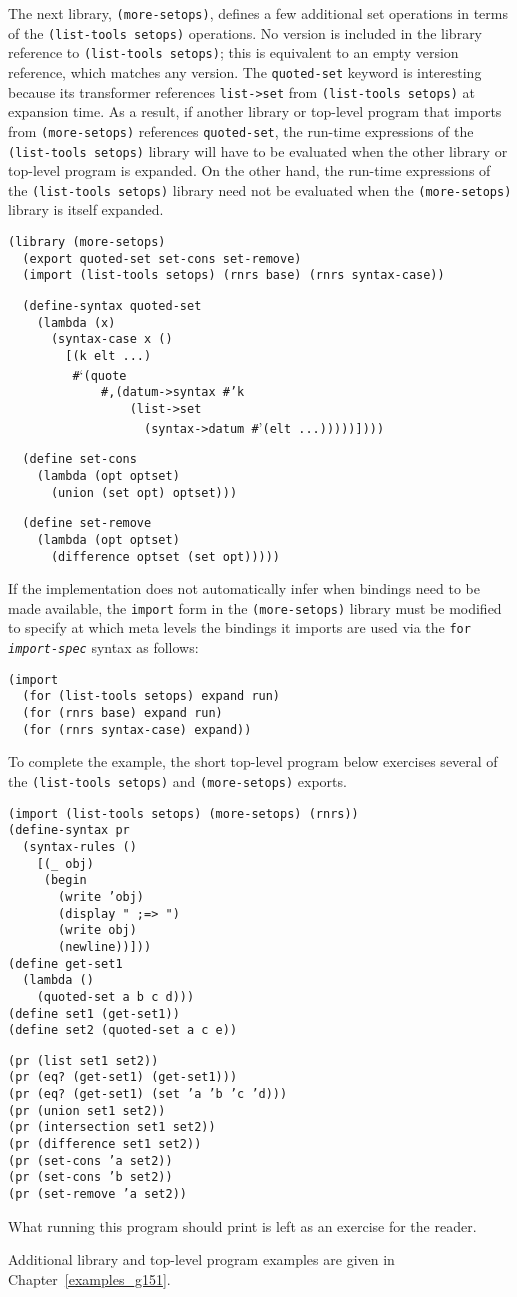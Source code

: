 The next library, \texttt{(more-setops)}, defines a few additional
set operations in terms of the \texttt{(list-tools setops)} operations.
No version is included in the library reference to
\texttt{(list-tools setops)}; this is equivalent to an empty version
reference, which matches any version.
The \texttt{quoted-set} keyword is interesting because its transformer
references \texttt{list-\textgreater{}set} from \texttt{(list-tools setops)} at
expansion time.
As a result, if another library or top-level program that imports from
\texttt{(more-setops)} references \texttt{quoted-set}, the run-time
expressions of the \texttt{(list-tools setops)} library will have to
be evaluated when the other library or top-level program is expanded.
On the other hand, the run-time expressions of the
\texttt{(list-tools setops)} library need not be evaluated when
the \texttt{(more-setops)} library is itself expanded.


\begin{alltt}
(library (more-setops)
  (export quoted-set set-cons set-remove)
  (import (list-tools setops) (rnrs base) (rnrs syntax-case))

  (define-syntax quoted-set
    (lambda (x)
      (syntax-case x ()
        [(k elt ...)
         \#{}`(quote
             \#{},(datum-\textgreater{}syntax \#{}'k
                 (list-\textgreater{}set
                   (syntax-\textgreater{}datum \#{}'(elt ...)))))])))

  (define set-cons
    (lambda (opt optset)
      (union (set opt) optset)))

  (define set-remove
    (lambda (opt optset)
      (difference optset (set opt)))))
\end{alltt}


If the implementation does not automatically infer when bindings need to
be made available, the \texttt{import} form in the \texttt{(more-setops)}
library must be modified to specify at which meta levels the bindings it
imports are used via the \texttt{for} \texttt{\textit{import-spec}} syntax as follows:


\begin{alltt}
(import
  (for (list-tools setops) expand run)
  (for (rnrs base) expand run)
  (for (rnrs syntax-case) expand))
\end{alltt}


To complete the example, the short top-level program below exercises
several of the \texttt{(list-tools setops)} and \texttt{(more-setops)}
exports.


\begin{alltt}
(import (list-tools setops) (more-setops) (rnrs))
(define-syntax pr
  (syntax-rules () 
    [(\_{} obj)
     (begin
       (write 'obj)
       (display " ;=\textgreater{} ")
       (write obj)
       (newline))]))
(define get-set1
  (lambda ()
    (quoted-set a b c d)))
(define set1 (get-set1))
(define set2 (quoted-set a c e))

(pr (list set1 set2))
(pr (eq? (get-set1) (get-set1)))
(pr (eq? (get-set1) (set 'a 'b 'c 'd)))
(pr (union set1 set2))
(pr (intersection set1 set2))
(pr (difference set1 set2))
(pr (set-cons 'a set2))
(pr (set-cons 'b set2))
(pr (set-remove 'a set2))
\end{alltt}


What running this program should print is left as an exercise for the
reader.


Additional library and top-level program examples are given in
Chapter \ref{examples_g151}.


